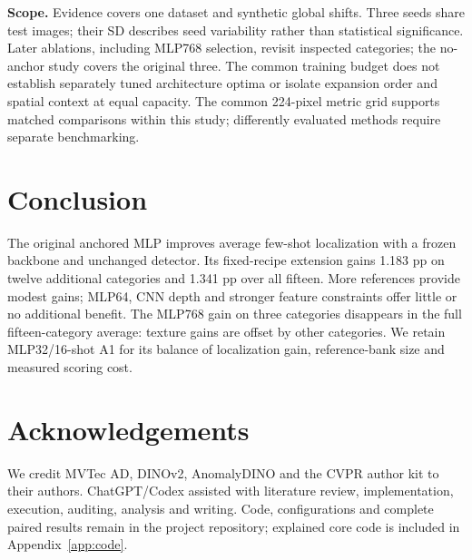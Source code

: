 \textbf{Scope.} Evidence covers one dataset and synthetic global shifts. Three seeds share test images; their SD describes seed variability rather than statistical significance. Later ablations, including MLP768 selection, revisit inspected categories; the no-anchor study covers the original three. The common training budget does not establish separately tuned architecture optima or isolate expansion order and spatial context at equal capacity. The common 224-pixel metric grid supports matched comparisons within this study; differently evaluated methods require separate benchmarking.

\section{Conclusion}
The original anchored MLP improves average few-shot localization with a frozen backbone and unchanged detector. Its fixed-recipe extension gains 1.183 pp on twelve additional categories and 1.341 pp over all fifteen. More references provide modest gains; MLP64, CNN depth and stronger feature constraints offer little or no additional benefit. The MLP768 gain on three categories disappears in the full fifteen-category average: texture gains are offset by other categories. We retain MLP32/16-shot A1 for its balance of localization gain, reference-bank size and measured scoring cost.

\section*{Acknowledgements}
We credit MVTec AD, DINOv2, AnomalyDINO and the CVPR author kit to their authors. ChatGPT/Codex assisted with literature review, implementation, execution, auditing, analysis and writing. Code, configurations and complete paired results remain in the project repository; explained core code is included in Appendix~\ref{app:code}.
